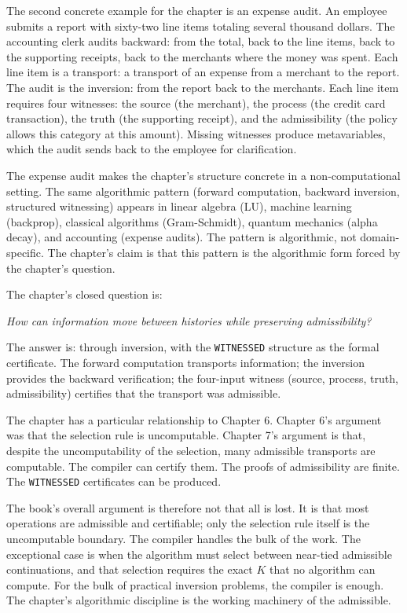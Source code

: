 \begin{chapteressay}
The second concrete example for the chapter is an expense audit.
An employee submits a report with sixty-two line items totaling
several thousand dollars. The accounting clerk audits backward:
from the total, back to the line items, back to the supporting
receipts, back to the merchants where the money was spent. Each
line item is a transport: a transport of an expense from a
merchant to the report. The audit is the inversion: from the
report back to the merchants. Each line item requires four
witnesses: the source (the merchant), the process (the credit
card transaction), the truth (the supporting receipt), and the
admissibility (the policy allows this category at this amount).
Missing witnesses produce metavariables, which the audit
sends back to the employee for clarification.

The expense audit makes the chapter's structure concrete in a
non-computational setting. The same algorithmic pattern
(forward computation, backward inversion, structured witnessing)
appears in linear algebra (LU), machine learning (backprop),
classical algorithms (Gram-Schmidt), quantum mechanics (alpha
decay), and accounting (expense audits). The pattern is
algorithmic, not domain-specific. The chapter's claim is that
this pattern is the algorithmic form forced by the chapter's
question.

The chapter's closed question is:

\begin{center}
\emph{How can information move between histories while preserving
admissibility?}
\end{center}

The answer is: through inversion, with the
\texttt{WITNESSED} structure as the formal certificate. The
forward computation transports information; the inversion
provides the backward verification; the four-input witness
(source, process, truth, admissibility) certifies that the
transport was admissible.

The chapter has a particular relationship to Chapter 6. Chapter
6's argument was that the selection rule is uncomputable.
Chapter 7's argument is that, despite the uncomputability of the
selection, many admissible transports are computable. The
compiler can certify them. The proofs of admissibility are
finite. The \texttt{WITNESSED} certificates can be produced.

The book's overall argument is therefore not that all is lost. It
is that most operations are admissible and certifiable; only the
selection rule itself is the uncomputable boundary. The compiler
handles the bulk of the work. The exceptional case is when the
algorithm must select between near-tied admissible continuations,
and that selection requires the exact $K$ that no algorithm can
compute. For the bulk of practical inversion problems, the
compiler is enough. The chapter's algorithmic discipline is the
working machinery of the admissible.


\end{chapteressay}
